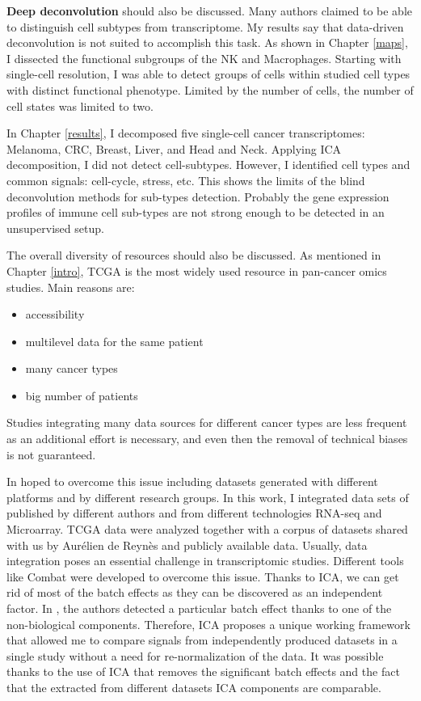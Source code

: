 \documentclass[12pt,]{book}
\providecommand{\tightlist}{%
  \setlength{\itemsep}{0pt}\setlength{\parskip}{0pt}}
\theoremstyle{definition}
\theoremstyle{definition}
\theoremstyle{definition}
\theoremstyle{remark}
\begin{document}
\textbf{Deep deconvolution } should also be discussed. Many authors
\citep[\citet{He2018}, \citet{Aran2017}]{Newman2015} claimed to be able
to distinguish cell subtypes from transcriptome. My results say that
data-driven deconvolution is not suited to accomplish this task. As
shown in Chapter \ref{maps}, I dissected the functional subgroups of the
NK and Macrophages. Starting with single-cell resolution, I was able to
detect groups of cells within studied cell types with distinct
functional phenotype. Limited by the number of cells, the number of cell
states was limited to two.

In Chapter \ref{results}, I decomposed five single-cell cancer
transcriptomes: Melanoma, CRC, Breast, Liver, and Head and Neck.
Applying ICA decomposition, I did not detect cell-subtypes. However, I
identified cell types and common signals: cell-cycle, stress, etc. This
shows the limits of the blind deconvolution methods for sub-types
detection. Probably the gene expression profiles of immune cell
sub-types are not strong enough to be detected in an unsupervised setup.

The overall diversity of resources should also be discussed. As
mentioned in Chapter \ref{intro}, TCGA is the most widely used resource
in pan-cancer omics studies. Main reasons are:

\begin{itemize}
\tightlist
\item
  accessibility
\item
  multilevel data for the same patient
\item
  many cancer types
\item
  big number of patients
\end{itemize}

Studies integrating many data sources for different cancer types are
less frequent as an additional effort is necessary, and even then the
removal of technical biases is not guaranteed.

In hoped to overcome this issue including datasets generated with
different platforms and by different research groups. In this work, I
integrated data sets of published by different authors and from
different technologies RNA-seq and Microarray. TCGA data were analyzed
together with a corpus of datasets shared with us by Aurélien de Reynès
and publicly available data. Usually, data integration poses an
essential challenge in transcriptomic studies. Different tools like
Combat \citep{Johnson207} were developed to overcome this issue. Thanks
to ICA, we can get rid of most of the batch effects as they can be
discovered as an independent factor. In \citep{Biton2014}, the authors
detected a particular batch effect thanks to one of the non-biological
components. Therefore, ICA proposes a unique working framework that
allowed me to compare signals from independently produced datasets in a
single study without a need for re-normalization of the data. It was
possible thanks to the use of ICA that removes the significant batch
effects and the fact that the extracted from different datasets ICA
components are comparable.
\end{document}
